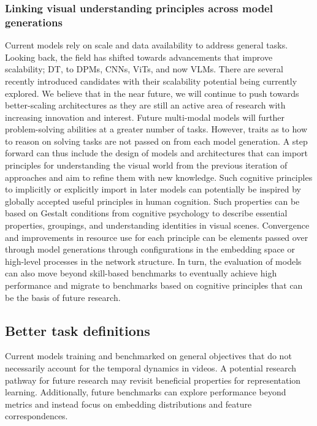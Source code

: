 
\subsubsection{Linking visual understanding principles across model generations}

Current models rely on scale and data availability to address general tasks. Looking back, the field has shifted towards advancements that improve scalability; DT, to DPMs, CNNs, ViTs, and now VLMs. There are several recently introduced candidates \citep{dao2022flashattention,gu2023mamba,poli2023hyena} with their scalability potential being currently explored. We believe that in the near future, we will continue to push towards better-scaling architectures as they are still an active area of research with increasing innovation and interest. Future multi-modal models will further problem-solving abilities at a greater number of tasks. However, traits as to how to reason on solving tasks are not passed on from each model generation. A step forward can thus include the design of models and architectures that can import principles for understanding the visual world from the previous iteration of approaches and aim to refine them with new knowledge. Such cognitive principles to implicitly or explicitly import in later models can potentially be inspired by globally accepted useful principles in human cognition. Such properties can be based on Gestalt conditions from cognitive psychology \citep{koffka2013principles,kohler1967gestalt} to describe essential properties, groupings, and understanding identities in visual scenes. Convergence and improvements in resource use for each principle can be elements passed over through model generations through configurations in the embedding space or high-level processes in the network structure. In turn, the evaluation of models can also move beyond skill-based benchmarks to eventually achieve high performance and migrate to benchmarks based on cognitive principles that can be the basis of future research.



\subsection{Better task definitions}
\label{sec:outlook::tasks}

Current models training and benchmarked on general objectives that do not necessarily account for the temporal dynamics in videos. A potential research pathway for future research may revisit beneficial properties for representation learning. Additionally, future benchmarks can explore performance beyond metrics and instead focus on embedding distributions and feature correspondences. 


